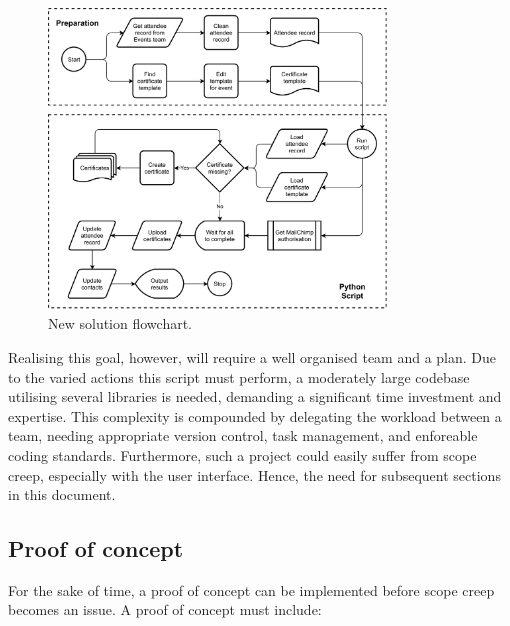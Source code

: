 \documentclass[11pt]{article}
\begin{document}
\begin{figure}[b!]
    \centering
    \includegraphics[width=0.8\textwidth]{figures/new_solution.pdf}
    \caption{New solution flowchart.}
    \label{fig:new-solution}
\end{figure}

Realising this goal, however, will require a well organised team and a plan. Due to the varied actions this script must perform, a moderately large codebase utilising several libraries is needed, demanding a significant time investment and expertise. This complexity is compounded by delegating the workload between a team, needing appropriate version control, task management, and enforeable coding standards. Furthermore, such a project could easily suffer from scope creep, especially with the user interface. Hence, the need for subsequent sections in this document.

\subsection{Proof of concept}

For the sake of time, a proof of concept can be implemented before scope creep becomes an issue. A proof of concept must include:
\end{document}
